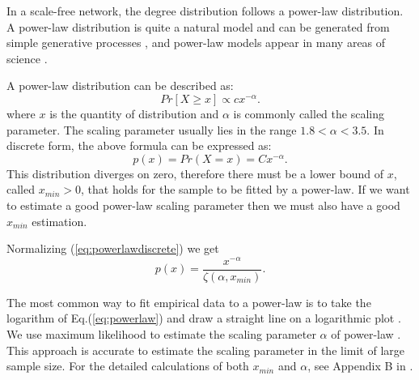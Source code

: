 \documentclass[paper]{ieice}
\begin{document}
In a scale-free network, the degree distribution follows a power-law distribution.   
A power-law distribution is quite a natural model and can be generated from simple generative processes \cite{mitzenmacher2004brief}, and power-law models appear in many areas of science \cite{clauset2009power} \cite{mitzenmacher2004brief}. 

A power-law distribution can be described as:
\begin{equation}
Pr[X\ge x] \propto cx^{-\alpha}.
\label{eq:powerlaw}
\end{equation}
where $x$ is the quantity of distribution and $\alpha$ is commonly called the scaling parameter. 
The scaling parameter usually lies in the range $1.8<\alpha<3.5$.
In discrete form, the above formula can be expressed as:
\begin{equation}
p(x) = Pr(X=x) = Cx^{- \alpha}.
\label{eq:powerlawdiscrete}
\end{equation}
This distribution diverges on zero, therefore there must be a lower bound of $x$, called $x_{min} > 0$, that holds for the sample to be fitted by a power-law. 
If we want to estimate a good power-law scaling parameter then we must also have a good $x_{min}$ estimation. 

Normalizing (\ref{eq:powerlawdiscrete})  we get
\begin{equation}
p(x)=\frac{x^{- \alpha}}{\zeta(\alpha,x_{min})}.
\end{equation} 

The most common way to fit empirical data to a power-law is to take the logarithm of Eq.(\ref{eq:powerlaw}) and draw a straight line on a logarithmic plot \cite{mitzenmacher2004brief}.  
We use maximum likelihood to estimate the scaling parameter $\alpha$ of power-law \cite{clauset2009power}.  
This approach is accurate to estimate the scaling parameter in the limit of large sample size. 
For the detailed calculations of both $x_{min}$ and $\alpha$, see Appendix B in \cite{clauset2009power}.
\end{document}
